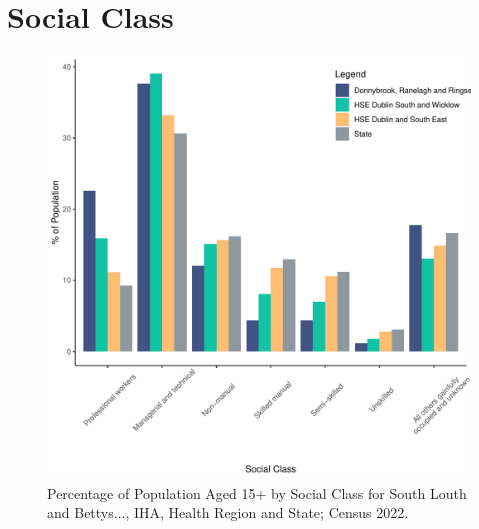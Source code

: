 \documentclass{article}
\begin{document}
\section{Social Class}\label{sect:SC}
\begin{figure}[H]
	\centering
	\includegraphics[width = 140mm]{../figures/SocialClassED.pdf}
	\caption{Percentage of Population Aged 15+ by Social Class for South Louth and Bettys..., IHA, Health Region and State; Census 2022.}
	\label{fig:vbnv}
	\end{figure}
\end{document}
